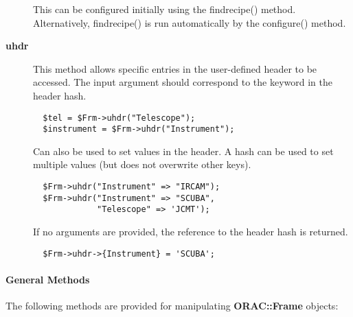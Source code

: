 \begin{description}
This can be configured initially using the findrecipe() method.
Alternatively, findrecipe() is run automatically by the configure()
method.

\item[\textbf{uhdr}] \mbox{}

This method allows specific entries in the user-defined header to be 
accessed. The input argument should correspond to the keyword in the header
hash.

\begin{verbatim}
  $tel = $Frm->uhdr("Telescope");
  $instrument = $Frm->uhdr("Instrument");
\end{verbatim}


Can also be used to set values in the header.
A hash can be used to set multiple values (but does not overwrite
other keys).

\begin{verbatim}
  $Frm->uhdr("Instrument" => "IRCAM");
  $Frm->uhdr("Instrument" => "SCUBA", 
             "Telescope" => 'JCMT');
\end{verbatim}


If no arguments are provided, the reference to the header hash
is returned.

\begin{verbatim}
  $Frm->uhdr->{Instrument} = 'SCUBA';
\end{verbatim}
\end{description}
\paragraph*{General Methods\label{ORAC::Frame_General_Methods}}

The following methods are provided for manipulating
\textbf{ORAC::Frame} objects:

